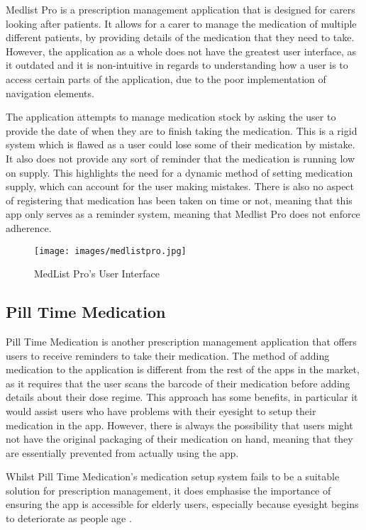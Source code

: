 \documentclass{l4proj}
\begin{document}
Medlist Pro is a prescription management application that is designed for carers looking after patients. It allows for a carer to manage the medication of multiple different patients, by providing details of the medication that they need to take. However, the application as a whole does not have the greatest user interface, as it outdated and it is non-intuitive in regards to understanding how a user is to access certain parts of the application, due to the poor implementation of navigation elements.

The application attempts to manage medication stock by asking the user to provide the date of when they are to finish taking the medication. This is a rigid system which is flawed as a user could lose some of their medication by mistake. It also does not provide any sort of reminder that the medication is running low on supply. This highlights the need for a dynamic method of setting medication supply, which can account for the user making mistakes. There is also no aspect of registering that medication has been taken on time or not, meaning that this app only serves as a reminder system, meaning that Medlist Pro does not enforce adherence. 

\begin{figure}
    \centering
    \texttt{[image: images/medlistpro.jpg]}
    \caption{MedList Pro's User Interface}
    \label{fig:medlist_pro}
\end{figure}

\subsection{Pill Time Medication}

Pill Time Medication is another prescription management application that offers users to receive reminders to take their medication. The method of adding medication to the application is different from the rest of the apps in the market, as it requires that the user scans the barcode of their medication before adding details about their dose regime. This approach has some benefits, in particular it would assist users who have problems with their eyesight to setup their medication in the app. However, there is always the possibility that users might not have the original packaging of their medication on hand, meaning that they are essentially prevented from actually using the app.

Whilst Pill Time Medication's medication setup system fails to be a suitable solution for prescription management, it does emphasise the importance of ensuring the app is accessible for elderly users, especially because eyesight begins to deteriorate as people age \citep{salvi2006ageing}.
\end{document}
